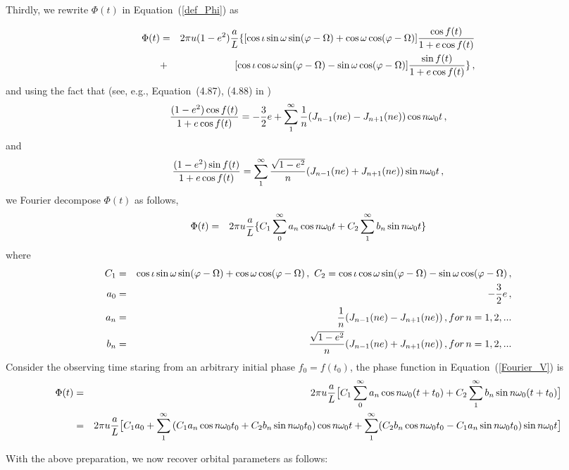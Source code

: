 \documentclass[twocolumn]{aastex62}
\def\m{\begin{eqnarray}}
\def\n{\end{eqnarray}}
\begin{document}
Thirdly, we rewrite $\Phi(t)$ in Equation~(\ref{def_Phi}) as
\begin{widetext}
\m
\Phi(t)&=&2 \pi u (1-e^2){a\over L} \{ [ \cos\iota \sin \omega  \sin (\varphi -\Omega )+\cos \omega  \cos (\varphi -\Omega ) ] \frac{\cos f(t)}{1+e \cos f(t)} \nonumber\\
  &+&[ \cos \iota \cos \omega  \sin (\varphi -\Omega )-\sin \omega \cos (\varphi -\Omega )] \frac{\sin f(t)}{1+e \cos f(t)} \}\,, \nonumber\\
\n
and using the fact that (see, e.g., Equation~(4.87), (4.88) in \citep{Maggiore2007})
\m
\frac{(1-e^2)\cos f(t)}{1+e \cos f(t)}=-{3\over 2}e+\sum^{\infty}_{1} {1\over n}(J_{n-1}(ne)-J_{n+1}(ne)) \cos{n \omega_0 t}\,,
\n
and 
\m
\frac{(1-e^2)\sin f(t)}{1+e \cos f(t)}=\sum^{\infty}_{1} {\sqrt{1-e^2}\over n}(J_{n-1}(ne)+J_{n+1}(ne)) \sin{n \omega_0 t}\,,
\n
we  Fourier decompose $\Phi(t)$ as follows, 
\m \label{Fourier_V}
 \Phi(t)&=&2 \pi u {a\over L} \{ C_1 \sum^{\infty}_{0} a_n \cos{n \omega_0 t} + C_2 \sum^{\infty}_{1} b_n \sin{n \omega_0 t} \}
  \n
where
\m
C_1&=& \cos\iota \sin \omega  \sin (\varphi -\Omega )+\cos \omega  \cos (\varphi -\Omega )\,, \ 
C_2=\cos \iota \cos \omega  \sin (\varphi -\Omega )-\sin \omega \cos (\varphi -\Omega )\,,  \nonumber\\
a_0&=&-{3\over 2}e\,, \nonumber\\
a_n&=&{1\over n}(J_{n-1}(ne)-J_{n+1}(ne))\,, for\, n=1,2,... \nonumber\\
b_n&=&{\sqrt{1-e^2}\over n}(J_{n-1}(ne)+J_{n+1}(ne))\,, for\, n=1,2,... \nonumber\\
\n
Consider the observing time staring from an arbitrary initial phase $f_0=f(t_0)$, the phase function in Equation~(\ref{Fourier_V}) is 
\m \label{Fourier_V_f0}
 \Phi(t)&=&2 \pi u {a\over L} \big[ C_1 \sum^{\infty}_{0} a_n \cos{n \omega_0 (t+t_0)} + C_2 \sum^{\infty}_{1} b_n \sin{n \omega_0 (t+t_0)} \big] \nonumber\\
 &=& 2 \pi u {a\over L} \big[ C_1 a_0 + \sum^{\infty}_{1} \left(C_1 a_n \cos{n \omega_0 t_0} + C_2 b_n \sin{n \omega_0 t_0} \right) \cos{n \omega_0 t}  
 + \sum^{\infty}_{1} (C_2 b_n \cos{n \omega_0 t_0} - C_1 a_n \sin{n \omega_0 t_0} )\sin{n \omega_0 t } \big] \nonumber\\
  \n
\end{widetext}

With the above preparation, we now recover orbital parameters as follows:
\end{document}
